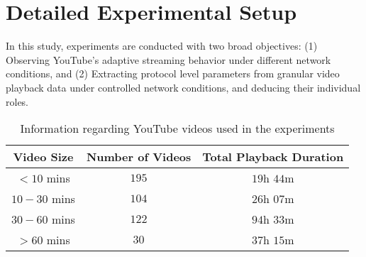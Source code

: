 \section{Detailed Experimental Setup}
\label{chap03s1:sec:experiments}

In this study, experiments are conducted with two broad objectives: (1) Observing YouTube's adaptive streaming behavior under different network conditions, and (2) Extracting protocol level parameters from granular video playback data under controlled network conditions, and deducing their individual roles.

\begin{comment}
\subsection{Experimental Setup for Observing Streaming Behavior} In the preliminary experiment, we play a YouTube video with frequent scene changes (video title: {\em ``The Division Walkthrough Gameplay Part 1 -- The Virus (PS4 Xbox One)''}, video ID: {\em b80ShWk\_Aro}, URL: \url{https://www.youtube.com/watch?v=b80ShWk_Aro}, video duration: $34$ min. $22$ sec.) by varying the link bandwidth using a dynamic throttling mechanism.
We refer to this video as our {\it sample video} throughout the rest of the this chapter.
Link throttling is enabled using the Unix library \texttt{NetFilterQueue}\footnote{\url{http://www.netfilter.org/projects/libnetfilter_queue/}}, which is a user-space library with an API to handle packets queued by the kernel packet filter.
Based on this library, we develop a traffic shaper to control link bandwidth.
We continuously monitor the bandwidth experienced at the browser, and ensure that the data is collected at intended bandwidth values.
During the video playback, we capture video data packets using the packet capture tool \texttt{tcpdump}; from these packet traces, we extract the amount of video data transferred from the YouTube server to the browser, with respect to time.
Additionally, we note the resolution in which the video is rendered, w.r.t. time.
\end{comment}
\begin{table}[!t]
 \small
 \centering
 \caption{\small{Information regarding YouTube videos used in the experiments}}
 \label{table:chap03s1:statvid}
 \begin{tabular}{|c|c|c|}
  \hline 
  \textbf{Video Size} & \textbf{Number of Videos} & \textbf{Total Playback Duration} \\
  \hline \hline 
  $<10$ mins & $195$ & $19$h $44$m \\
  \hline 
  $10-30$ mins & $104$ & $26$h $07$m \\
  \hline 
  $30-60$ mins & $122$ & $94$h $33$m \\
  \hline 
  $>60$ mins & $30$ & $37$h $15$m \\
  \hline 
 \end{tabular}
\end{table}

